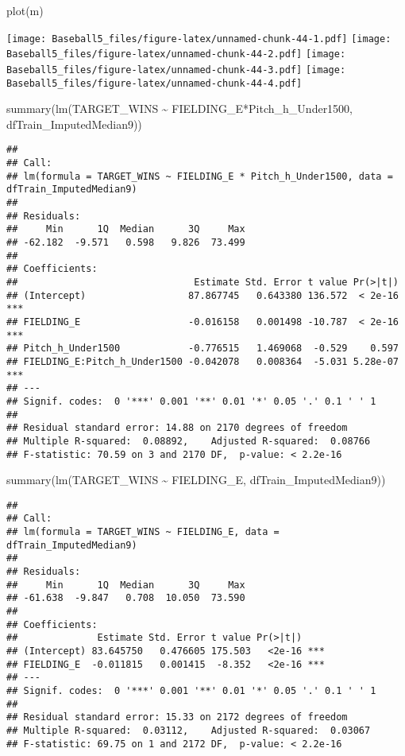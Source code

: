 \documentclass[
]{article}
\newenvironment{Shaded}{\begin{snugshade}}{\end{snugshade}}
\newcommand{\FunctionTok}[1]{\textcolor[rgb]{0.00,0.00,0.00}{#1}}
\newcommand{\NormalTok}[1]{#1}
\newcommand{\SpecialCharTok}[1]{\textcolor[rgb]{0.00,0.00,0.00}{#1}}
\begin{document}
\begin{Shaded}
\begin{Highlighting}[]
\FunctionTok{plot}\NormalTok{(m)}
\end{Highlighting}
\end{Shaded}

\texttt{[image: Baseball5\_files/figure-latex/unnamed-chunk-44-1.pdf]}
\texttt{[image: Baseball5\_files/figure-latex/unnamed-chunk-44-2.pdf]}
\texttt{[image: Baseball5\_files/figure-latex/unnamed-chunk-44-3.pdf]}
\texttt{[image: Baseball5\_files/figure-latex/unnamed-chunk-44-4.pdf]}

\begin{Shaded}
\begin{Highlighting}[]
\FunctionTok{summary}\NormalTok{(}\FunctionTok{lm}\NormalTok{(TARGET\_WINS }\SpecialCharTok{\textasciitilde{}}\NormalTok{ FIELDING\_E}\SpecialCharTok{*}\NormalTok{Pitch\_h\_Under1500, dfTrain\_ImputedMedian9))}
\end{Highlighting}
\end{Shaded}

\begin{verbatim}
## 
## Call:
## lm(formula = TARGET_WINS ~ FIELDING_E * Pitch_h_Under1500, data = dfTrain_ImputedMedian9)
## 
## Residuals:
##     Min      1Q  Median      3Q     Max 
## -62.182  -9.571   0.598   9.826  73.499 
## 
## Coefficients:
##                               Estimate Std. Error t value Pr(>|t|)    
## (Intercept)                  87.867745   0.643380 136.572  < 2e-16 ***
## FIELDING_E                   -0.016158   0.001498 -10.787  < 2e-16 ***
## Pitch_h_Under1500            -0.776515   1.469068  -0.529    0.597    
## FIELDING_E:Pitch_h_Under1500 -0.042078   0.008364  -5.031 5.28e-07 ***
## ---
## Signif. codes:  0 '***' 0.001 '**' 0.01 '*' 0.05 '.' 0.1 ' ' 1
## 
## Residual standard error: 14.88 on 2170 degrees of freedom
## Multiple R-squared:  0.08892,    Adjusted R-squared:  0.08766 
## F-statistic: 70.59 on 3 and 2170 DF,  p-value: < 2.2e-16
\end{verbatim}

\begin{Shaded}
\begin{Highlighting}[]
\FunctionTok{summary}\NormalTok{(}\FunctionTok{lm}\NormalTok{(TARGET\_WINS }\SpecialCharTok{\textasciitilde{}}\NormalTok{ FIELDING\_E, dfTrain\_ImputedMedian9))}
\end{Highlighting}
\end{Shaded}

\begin{verbatim}
## 
## Call:
## lm(formula = TARGET_WINS ~ FIELDING_E, data = dfTrain_ImputedMedian9)
## 
## Residuals:
##     Min      1Q  Median      3Q     Max 
## -61.638  -9.847   0.708  10.050  73.590 
## 
## Coefficients:
##              Estimate Std. Error t value Pr(>|t|)    
## (Intercept) 83.645750   0.476605 175.503   <2e-16 ***
## FIELDING_E  -0.011815   0.001415  -8.352   <2e-16 ***
## ---
## Signif. codes:  0 '***' 0.001 '**' 0.01 '*' 0.05 '.' 0.1 ' ' 1
## 
## Residual standard error: 15.33 on 2172 degrees of freedom
## Multiple R-squared:  0.03112,    Adjusted R-squared:  0.03067 
## F-statistic: 69.75 on 1 and 2172 DF,  p-value: < 2.2e-16
\end{verbatim}
\end{document}
